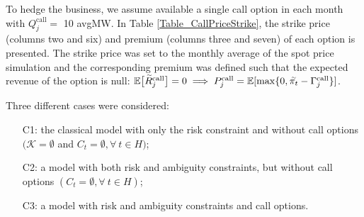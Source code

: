 	To hedge the business, we assume available a single call option in each month with $Q_{j}^{\text{call}} = $ 10 avgMW. In Table \ref{Table_CallPriceStrike}, the strike price (columns two and six) and premium (columns three and seven) of each option is presented. The strike price was set to the monthly average of the spot price simulation and the corresponding premium was defined such that the expected revenue of the option is null: $\mathbb{E} \big[\accentset{\sim}{R}_{j}^{\text{call}}\big] = 0 \implies P_{j}^{\text{call}} = \mathbb{E}[ \max\{0, \accentset{\sim}{\pi_{t}} - \Gamma_{j}^{\text{call}}\}]$. 

	Three different cases were considered: 
\begin{itemize}
	\item[C1:] the classical model with only the risk constraint and without call options $(\mathcal{K} = \emptyset$ and $C_{t} = \emptyset, \forall ~ t \in H)$; 
	\item[C2:] a model with both risk and ambiguity constraints, but without call options $(C_{t} = \emptyset, \forall ~ t \in H)$; 
	\item[C3:] a model with risk and ambiguity constraints and call options. 
\end{itemize}

